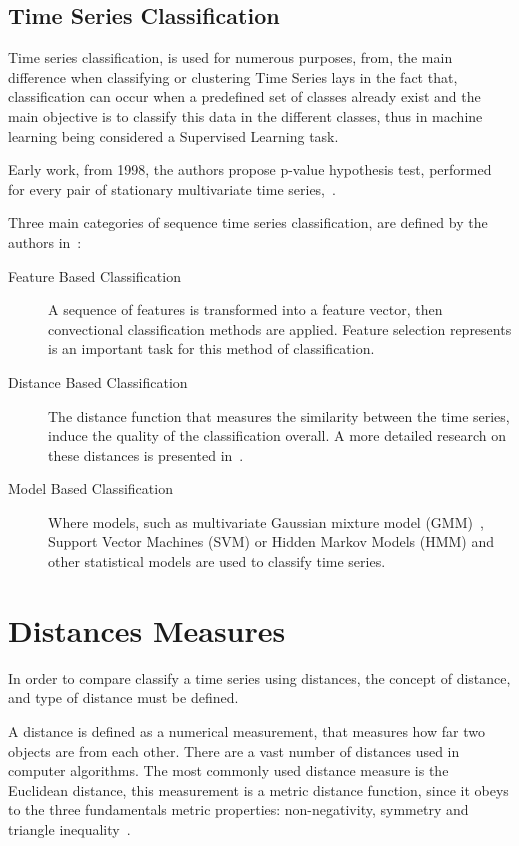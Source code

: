 

\subsection{Time Series Classification}
\label{section: ch2 timeseriesclassification}
Time series classification, is used for numerous purposes, from, the main difference when classifying or clustering Time Series lays in the fact that, classification can occur when a predefined set of classes already exist and the main objective is to classify this data in the different classes, thus in machine learning being considered a Supervised Learning task. 

Early work, from 1998, the authors propose p-value hypothesis test, performed for every pair of stationary multivariate time series,~\cite{MTS1999}.

Three main categories of sequence time series classification, are defined by the authors in~\cite{MTS_Classification}:

\begin{description}
\item[Feature Based Classification] A sequence of features is transformed into a feature vector, then convectional classification methods are applied. Feature selection represents is an important task for this method of classification.

\item [Distance Based Classification] The distance function that measures the
similarity between the time series, induce the quality of the classification overall. A more detailed research on these distances is presented in~\cite{Knorr2000}.

\item [Model Based Classification] Where models, such as multivariate Gaussian mixture model (GMM)~\cite{Laxhammar2008}, Support Vector Machines (SVM) or Hidden Markov Models (HMM) and other statistical models are used to classify time series.
\end{description}
 

\section{Distances Measures}
In order to compare classify a time series using distances, the concept of distance, and type of distance must be defined.

A distance is defined as a numerical measurement, that measures how far two objects are from each other. There are a vast number of distances used in computer algorithms. The most commonly used distance measure is the Euclidean distance, this measurement is a metric distance function, since it obeys to the three fundamentals metric properties: non-negativity, symmetry and triangle inequality~\cite{Cai2004}. 

